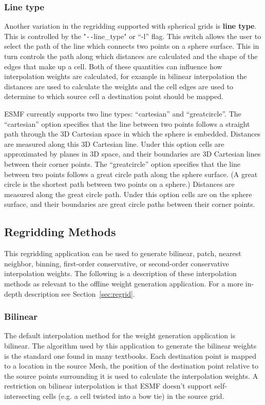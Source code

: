 \subsubsection{Line type}\label{sec:rwg_linetype}
 Another variation in the regridding supported with spherical grids is {\bf line type}. This is controlled by the "\verb+--+line\_type" or ``-l'' flag. This switch allows the user to select the path of the line which connects
two points on a sphere surface. This in turn controls the path along which distances are calculated and the shape of 
the edges that make up a cell. Both of these quantities can influence how interpolation weights are calculated, for example in
bilinear interpolation the distances are used to calculate the weights and the cell edges are used to determine to which source 
cell a destination point should be mapped. 

ESMF currently supports two line types: ``cartesian'' and ``greatcircle''. The ``cartesian'' option 
specifies that the line between two points follows a straight path through the 3D Cartesian space in which the sphere is embedded.
Distances are measured along  this 3D Cartesian line. Under this option cells are approximated by planes in 3D space, and their boundaries are 
3D Cartesian lines between their corner points.  The ``greatcircle'' option specifies that the line between two points follows
a great circle path along the sphere surface. (A great circle is the shortest path between two points on a sphere.) 
Distances are measured along the great circle path. Under this option cells are on the sphere surface, and their boundaries 
are great circle paths between their corner points. 


\subsection{Regridding Methods}\label{sec:rwg_regridmethods}
 This regridding application can be used to generate bilinear, patch, nearest neighbor, binning, first-order conservative, or second-order conservative 
interpolation weights. The following is a description of these interpolation methods as relevant to the offline weight generation application. For a more in-depth description see Section~\ref{sec:regrid}.

\subsubsection{Bilinear}\label{sec:rwg_bilinear}
 The default interpolation method for the weight generation application is bilinear. The algorithm used by this application to 
generate the bilinear weights is the standard one found in many textbooks.  Each destination point is mapped to a location
in the source Mesh, the position of the destination point relative to the source points surrounding it is used to calculate the interpolation weights. A restriction on
bilinear interpolation is that ESMF doesn't support self-intersecting cells (e.g. a cell twisted into a bow tie) in the source grid.


